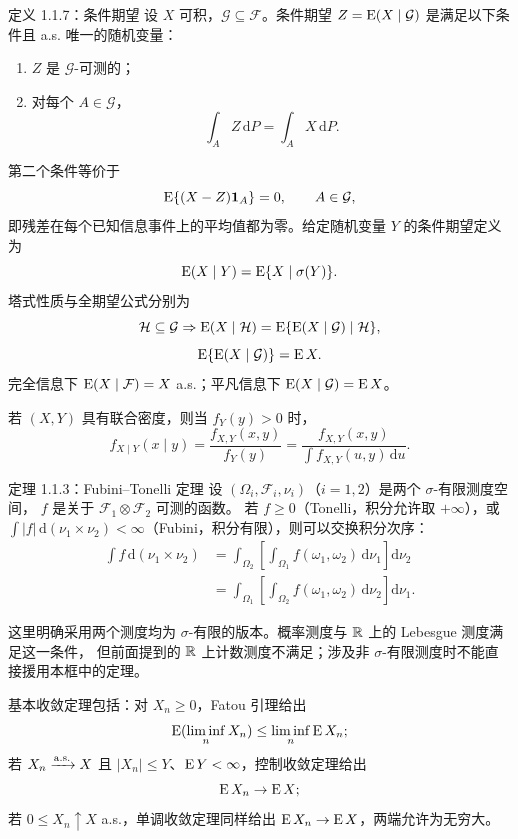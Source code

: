 \begin{definitionbox}{定义 1.1.7：条件期望}
设 $X$ 可积，$\mathcal G\subseteq\mathcal F$。条件期望 $Z=\operatorname{E}(X\mid\mathcal G)$ 是满足以下条件且 a.s. 唯一的随机变量：
\begin{enumerate}
 \item $Z$ 是 $\mathcal G$-可测的；
 \item 对每个 $A\in\mathcal G$，
 \[
  \int_A Z\,\mathrm dP=\int_A X\,\mathrm dP.
 \]
\end{enumerate}
\end{definitionbox}

第二个条件等价于
\[
 \operatorname{E}\{(X-Z)\mathbf 1_A\}=0,
 \qquad A\in\mathcal G,
\]
即残差在每个已知信息事件上的平均值都为零。给定随机变量 $Y$ 的条件期望定义为
\[
 \operatorname{E}(X\mid Y)=\operatorname{E}\{X\mid\sigma(Y)\}.
\]
塔式性质与全期望公式分别为
\[
 \mathcal H\subseteq\mathcal G
 \Rightarrow
 \operatorname{E}(X\mid\mathcal H)
 =\operatorname{E}\{\operatorname{E}(X\mid\mathcal G)\mid\mathcal H\},
\]
\[
 \operatorname{E}\{\operatorname{E}(X\mid\mathcal G)\}=\operatorname{E} X.
\]
完全信息下 $\operatorname{E}(X\mid\mathcal F)=X$ a.s.；平凡信息下 $\operatorname{E}(X\mid\mathcal G)=\operatorname{E} X$。

若 $(X,Y)$ 具有联合密度，则当 $f_Y(y)>0$ 时，
\[
 f_{X\mid Y}(x\mid y)
 =\frac{f_{X,Y}(x,y)}{f_Y(y)}
 =\frac{f_{X,Y}(x,y)}{\int f_{X,Y}(u,y)\,\mathrm du}.
\]

\begin{definitionbox}{定理 1.1.3：Fubini--Tonelli 定理}
设 $(\Omega_i,\mathcal F_i,\nu_i)$（$i=1,2$）是两个 $\sigma$-有限测度空间，
$f$ 是关于 $\mathcal F_1\otimes\mathcal F_2$ 可测的函数。
若 $f\geq0$（Tonelli，积分允许取 $+\infty$），或
$\int|f|\,\mathrm d(\nu_1\times\nu_2)<\infty$（Fubini，积分有限），则可以交换积分次序：
\[
\begin{aligned}
 \int f\,\mathrm d(\nu_1\times\nu_2)
 &=\int_{\Omega_2}\!\left[\int_{\Omega_1}f(\omega_1,\omega_2)\,\mathrm d\nu_1\right]\mathrm d\nu_2\\
 &=\int_{\Omega_1}\!\left[\int_{\Omega_2}f(\omega_1,\omega_2)\,\mathrm d\nu_2\right]\mathrm d\nu_1.
\end{aligned}
\]
\end{definitionbox}

这里明确采用两个测度均为 $\sigma$-有限的版本。概率测度与 $\mathbb R$ 上的 Lebesgue 测度满足这一条件，
但前面提到的 $\mathbb R$ 上计数测度不满足；涉及非 $\sigma$-有限测度时不能直接援用本框中的定理。

基本收敛定理包括：对 $X_n\geq0$，Fatou 引理给出
\[
 \operatorname{E}(\liminf_nX_n)\leq\liminf_n\operatorname{E} X_n;
\]
若 $X_n\xrightarrow{\mathrm{a.s.}} X$ 且 $|X_n|\leq Y$、$\operatorname{E} Y<\infty$，控制收敛定理给出
\[
 \operatorname{E} X_n\to\operatorname{E} X;
\]
若 $0\leq X_n\uparrow X$ a.s.，单调收敛定理同样给出 $\operatorname{E} X_n\to\operatorname{E} X$，两端允许为无穷大。

